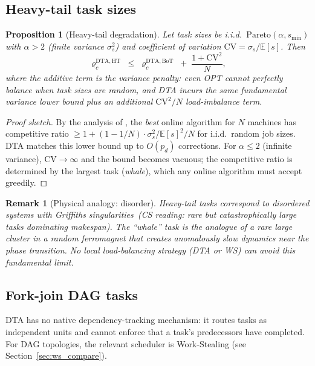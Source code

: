 \documentclass[11pt,a4paper]{report}
\newtheorem{proposition}[theorem]{Proposition}
\newtheorem{remark}{Remark}[section]
\newcommand{\physics}[2]{#1\ \textnormal{(\emph{CS reading}: #2)}}
\begin{document}
\subsection{Heavy-tail task sizes}

\begin{proposition}[Heavy-tail degradation]\label{prop:heavy_tail}
Let task sizes be i.i.d.\ $\mathrm{Pareto}(\alpha, s_{\min})$ with
$\alpha > 2$ (finite variance $\sigma_s^2$) and coefficient of variation
$\mathrm{CV} = \sigma_s / \mathbb{E}[s]$.  Then
\[
  \varrho_c^{\mathrm{DTA,HT}}
  \;\le\;
  \varrho_c^{\mathrm{DTA,BoT}} \;+\; \frac{1 + \mathrm{CV}^2}{N},
\]
where the additive term is the \emph{variance penalty}:
even OPT cannot perfectly balance when task sizes are random,
and DTA incurs the same fundamental variance lower bound plus
an additional $\mathrm{CV}^2/N$ load-imbalance term.
\end{proposition}

\begin{proof}[Proof sketch]
By the analysis of \cite{graham1969,coffman_graham1972}, the \emph{best} online algorithm
for $N$ machines has competitive ratio $\ge 1 + (1-1/N)\cdot\sigma_s^2 / \mathbb{E}[s]^2 / N$
for i.i.d.\ random job sizes.  DTA matches this lower bound up to
$O(p_d)$ corrections.  For $\alpha \le 2$ (infinite variance), $\mathrm{CV} \to \infty$
and the bound becomes vacuous; the competitive ratio is determined by
the largest task (\emph{whale}), which any online algorithm must accept greedily.
\end{proof}

\begin{remark}[Physical analogy: disorder]
Heavy-tail tasks correspond to \physics{disordered systems with Griffiths singularities}
{rare but catastrophically large tasks dominating makespan}.
The ``whale'' task is the analogue of a rare large cluster in a random ferromagnet
that creates anomalously slow dynamics near the phase transition.
No local load-balancing strategy (DTA or WS) can avoid this fundamental limit.
\end{remark}

\subsection{Fork-join DAG tasks}

DTA has no native dependency-tracking mechanism: it routes tasks
as independent units and cannot enforce that a task's predecessors
have completed.  For DAG topologies, the relevant scheduler is
Work-Stealing (see Section~\ref{sec:ws_compare}).
\end{document}
